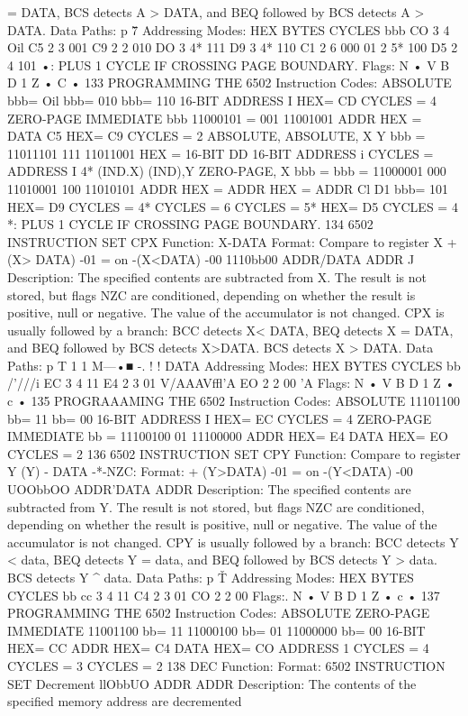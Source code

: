 \documentclass{book}
\begin{document}
= DATA, BCS detects A > DATA, and BEQ followed by BCS
detects A > DATA.
Data Paths:
p
\v
7
Addressing Modes:
HEX
BYTES
CYCLES
bbb
CO
3
4
Oil
C5
2
3
001
C9
2
2
010
DO
3
4*
111
D9
3
4*
110
C1
2
6
000
01
2
5*
100
D5
2
4
101
•: PLUS 1 CYCLE IF CROSSING PAGE BOUNDARY.
Flags:
N
•
V B D 1 Z
•
C
•
133
PROGRAMMING THE 6502
Instruction Codes:
ABSOLUTE
bbb= Oil
bbb= 010
bbb= 110
16-BIT ADDRESS
I
HEX= CD CYCLES = 4
ZERO-PAGE
IMMEDIATE
bbb
11000101
= 001
11001001
ADDR
HEX =
DATA
C5
HEX= C9 CYCLES = 2
ABSOLUTE,
ABSOLUTE,
X
Y
bbb =
11011101
111
11011001
HEX =
16-BIT
DD
16-BIT
ADDRESS
i
CYCLES =
ADDRESS
I
4*
(IND.X)
(IND),Y
ZERO-PAGE, X
bbb =
bbb =
11000001
000
11010001
100
11010101
ADDR
HEX =
ADDR
HEX =
ADDR
Cl
D1
bbb= 101
HEX= D9 CYCLES = 4*
CYCLES = 6
CYCLES = 5*
HEX= D5 CYCLES = 4
*: PLUS 1 CYCLE IF CROSSING PAGE BOUNDARY.
134
6502 INSTRUCTION SET
CPX
Function:
X-DATA
Format:
Compare to register X
+ (X> DATA)
-01
=
on
-(X<DATA)
-00
1110bb00 ADDR/DATA ADDR
J
Description:
The specified contents are subtracted from X. The result is not
stored, but flags NZC are conditioned, depending on whether the
result is positive, null or negative. The value of the accumulator
is not changed. CPX is usually followed by a branch: BCC detects X<
DATA, BEQ detects X = DATA, and BEQ followed by BCS detects
X>DATA. BCS detects X > DATA.
Data Paths:
p
T
1
1
M—•■
-.
! !
DATA
Addressing Modes:
HEX
BYTES
CYCLES
bb
/'///i
EC
3
4
11
E4
2
3
01
V/AAAVffl'A
EO
2
2
00
'A
Flags:
N
•
V B D 1 Z
•
c
•
135
PROGRAAAMING THE 6502
Instruction Codes:
ABSOLUTE 11101100
bb= 11
bb= 00
16-BIT ADDRESS
I
HEX= EC CYCLES = 4
ZERO-PAGE
IMMEDIATE
bb =
11100100
01
11100000
ADDR
HEX= E4
DATA
HEX= EO CYCLES = 2
136
6502 INSTRUCTION SET
CPY
Function:
Compare to register Y
(Y) - DATA -*-NZC:
Format:
+ (Y>DATA)
-01
=
on
-(Y<DATA)
-00
UOObbOO ADDR'DATA ADDR
Description:
The specified contents are subtracted from Y. The result is not
stored, but flags NZC are conditioned, depending on whether the
result is positive, null or negative. The value of the accumulator
is not changed. CPY is usually followed by a branch: BCC detects
Y < data, BEQ detects Y = data, and BEQ followed by BCS
detects Y > data. BCS detects Y ^ data.
Data Paths:
p
\v
T
Addressing Modes:
HEX
BYTES
CYCLES
bb
cc
3
4
11
C4
2
3
01
CO
2
2
00
Flags:.
N
•
V B D 1 Z
•
c
•
137
PROGRAMMING THE 6502
Instruction Codes:
ABSOLUTE
ZERO-PAGE
IMMEDIATE
11001100
bb= 11
11000100
bb= 01
11000000
bb= 00
16-BIT
HEX= CC
ADDR
HEX= C4
DATA
HEX= CO
ADDRESS
1
CYCLES = 4
CYCLES = 3
CYCLES = 2
138
DEC
Function:
Format:
6502 INSTRUCTION SET
Decrement
llObbUO ADDR ADDR
Description:
The contents of the specified memory address are decremented
\end{document}
